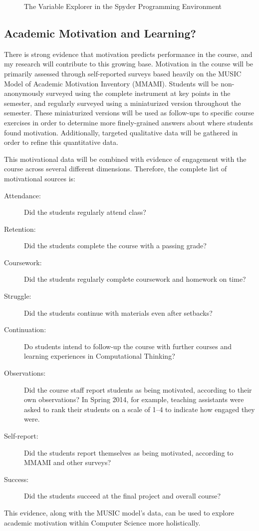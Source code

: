 \begin{figure}[!ht]
\caption{The Variable Explorer in the Spyder Programming Environment}
\label{fig-spyder-explorer}
\end{figure}

\subsection{Academic Motivation and Learning?}
There is strong evidence that motivation predicts performance in the course, and my research will contribute to this growing base.
Motivation in the course will be primarily assessed through self-reported surveys based heavily on the MUSIC Model of Academic Motivation Inventory (MMAMI).
Students will be non-anonymously surveyed using the complete instrument at key points in the semester, and regularly surveyed using a miniaturized version throughout the semester.
These miniaturized versions will be used as follow-ups to specific course exercises in order to determine more finely-grained answers about where students found motivation.
Additionally, targeted qualitative data will be gathered in order to refine this quantitative data.

This motivational data will be combined with evidence of engagement with the course across several different dimensions. Therefore, the complete list of motivational sources is:
\begin{description}
	\item[Attendance:] Did the students regularly attend class?
	\item[Retention:] Did the students complete the course with a passing grade?
	\item[Coursework:] Did the students regularly complete coursework and homework on time?
	\item[Struggle:] Did the students continue with materials even after setbacks?
	\item[Continuation:] Do students intend to follow-up the course with further courses and learning experiences in Computational Thinking?
	\item[Observations:] Did the course staff report students as being motivated, according to their own observations? In Spring 2014, for example, teaching assistants were asked to rank their students on a scale of 1--4 to indicate how engaged they were.
	\item[Self-report:] Did the students report themselves as being motivated, according to MMAMI and other surveys?
	\item[Success:] Did the students succeed at the final project and overall course?
\end{description}
This evidence, along with the MUSIC model's data, can be used to explore academic motivation within Computer Science more holistically.

